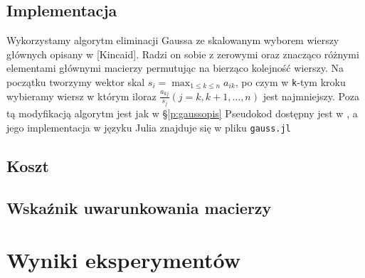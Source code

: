 \documentclass[11pt,wide]{mwart}
\begin{document}
\subsection{Implementacja}
Wykorzystamy algorytm eliminacji Gaussa ze skalowanym wyborem wierszy głównych opisany w [Kincaid]. Radzi on sobie z zerowymi oraz znacząco różnymi elementami głównymi macierzy permutując na bierząco kolejność wierszy. Na początku tworzymy wektor skal $ s_i = \max_{1 \leq k \leq n}a_{ik} $, po czym w \texttt{k}-tym kroku wybieramy wiersz w którym iloraz $ \frac{a_{kj}}{s_j} (j = k, k+1, \ldots,n)$ jest najmniejszy. Poza tą modyfikacją algorytm jest jak w \S\ref{p:gaussopis} Pseudokod dostępny jest w \cite{kincaid}, a jego implementacja w języku Julia znajduje się w pliku \texttt{gauss.jl}
\subsection{Koszt} \label{SS:gausscost}
\subsection{Wskaźnik uwarunkowania macierzy}
\section{Wyniki eksperymentów}
\end{document}
